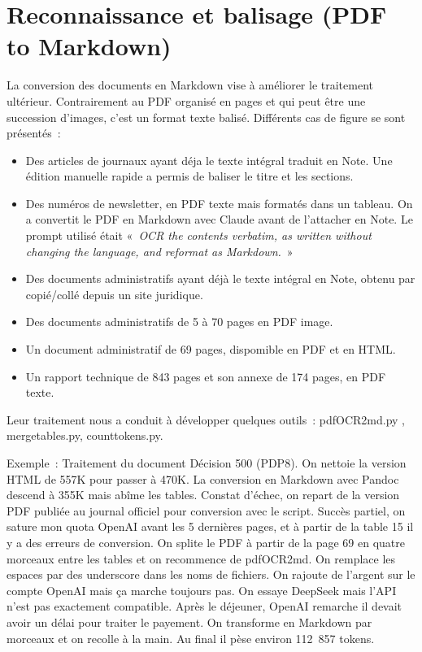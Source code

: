 \documentclass[a4paper,11pt]{report}
\providecommand{\tightlist}{\setlength{\itemsep}{0pt}\setlength{\parskip}{0pt}}
\begin{document}
\section{Reconnaissance et balisage (PDF to Markdown)}\label{reconnaissance-et-balisage-pdf-to-markdown}

La conversion des documents en Markdown vise à améliorer le traitement ultérieur. Contrairement au PDF organisé en pages et qui peut être une succession d'images, c'est un format texte balisé. Différents cas de figure se sont présentés~:

\begin{itemize}
\tightlist
\item
  Des articles de journaux ayant déja le texte intégral traduit en Note. Une édition manuelle rapide a permis de baliser le titre et les sections.
\item
  Des numéros de newsletter, en PDF texte mais formatés dans un tableau. On a convertit le PDF en Markdown avec Claude avant de l'attacher en Note. Le prompt utilisé était «~\emph{OCR the contents verbatim, as written without changing the language, and reformat as Markdown.}~»
\item
  Des documents administratifs ayant déjà le texte intégral en Note, obtenu par copié/collé depuis un site juridique.
\item
  Des documents administratifs de 5 à 70 pages en PDF image.
\item
  Un document administratif de 69 pages, dispomible en PDF et en HTML.
\item
  Un rapport technique de 843 pages et son annexe de 174 pages, en PDF texte.
\end{itemize}

Leur traitement nous a conduit à développer quelques outils~: pdfOCR2md.py , mergetables.py, counttokens.py.

Exemple~: Traitement du document Décision 500 (PDP8). On nettoie la version HTML de 557K pour passer à 470K. La conversion en Markdown avec Pandoc descend à 355K mais abîme les tables. Constat d'échec, on repart de la version PDF publiée au journal officiel pour conversion avec le script. Succès partiel, on sature mon quota OpenAI avant les 5 dernières pages, et à partir de la table 15 il y a des erreurs de conversion. On splite le PDF à partir de la page 69 en quatre morceaux entre les tables et on recommence de pdfOCR2md. On remplace les espaces par des underscore dans les noms de fichiers. On rajoute de l'argent sur le compte OpenAI mais ça marche toujours pas. On essaye DeepSeek mais l'API n'est pas exactement compatible. Après le déjeuner, OpenAI remarche il devait avoir un délai pour traiter le payement. On transforme en Markdown par morceaux et on recolle à la main. Au final il pèse environ 112~857 tokens.
\end{document}
